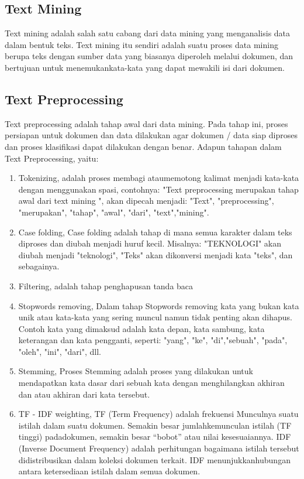 \documentclass{article}
\begin{document}
\subsection{Text Mining}
Text mining adalah salah satu cabang dari data mining yang menganalisis data dalam 
bentuk teks. Text mining itu sendiri adalah suatu proses data mining berupa teks 
dengan sumber data yang biasanya diperoleh melalui dokumen, dan bertujuan untuk 
menemukankata-kata yang dapat mewakili isi dari dokumen.
\subsection{Text Preprocessing}
Text preprocessing adalah tahap awal dari data mining. Pada tahap ini, proses persiapan 
untuk dokumen dan data dilakukan agar dokumen / data siap diproses dan proses 
klasifikasi dapat dilakukan dengan benar. Adapun tahapan dalam Text Preprocessing, 
yaitu:
\begin{enumerate}[{a.}]
\item Tokenizing, 
adalah proses membagi ataumemotong kalimat menjadi kata-kata dengan 
menggunakan spasi, contohnya: "Text preprocessing merupakan tahap awal dari text 
mining ", akan dipecah menjadi: "Text", "preprocessing", "merupakan", "tahap", 
"awal", "dari", "text","mining". 

\item Case folding, 
Case folding adalah tahap di mana semua karakter dalam teks diproses dan diubah 
menjadi huruf kecil. Misalnya: "TEKNOLOGI" akan diubah menjadi "teknologi", 
"Teks" akan dikonversi menjadi kata "teks", dan sebagainya.

\item Filtering,
adalah tahap penghapusan tanda baca

\item Stopwords removing, 
Dalam tahap Stopwords removing kata yang bukan kata unik atau kata-kata yang 
sering muncul namun tidak penting akan dihapus. Contoh kata yang dimaksud adalah 
kata depan, kata sambung, kata keterangan dan kata pengganti, seperti: "yang", "ke", 
"di","sebuah", "pada", "oleh", "ini", "dari", dll.

\item Stemming,
Proses Stemming adalah proses yang dilakukan untuk mendapatkan kata dasar dari 
sebuah kata dengan menghilangkan akhiran dan atau akhiran dari kata tersebut.

\item TF - IDF weighting, 
TF (Term Frequency) adalah frekuensi Munculnya suatu istilah dalam suatu dokumen. 
Semakin besar jumlahkemunculan istilah (TF tinggi) padadokumen, semakin besar 
“bobot” atau nilai kesesuaiannya. IDF (Inverse Document Frequency) adalah 
perhitungan bagaimana istilah tersebut didistribusikan dalam koleksi dokumen terkait. 
IDF menunjukkanhubungan antara ketersediaan istilah dalam semua dokumen. 
\end{enumerate}
\end{document}
